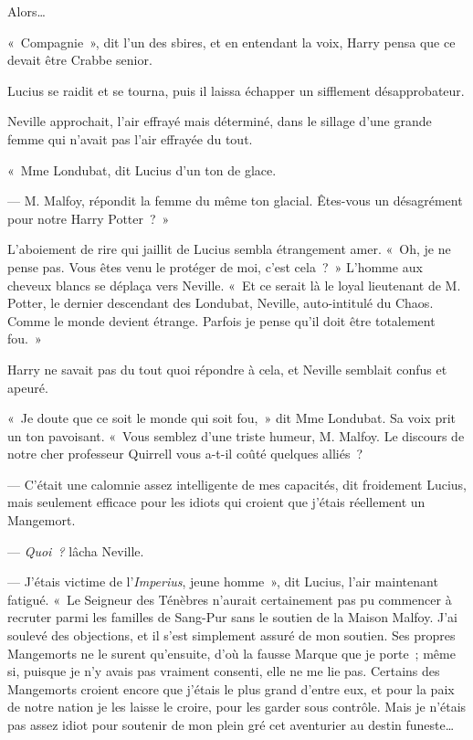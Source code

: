Alors…

«~Compagnie~», dit l'un des sbires, et en entendant la voix, Harry pensa que ce devait être Crabbe senior.

Lucius se raidit et se tourna, puis il laissa échapper un sifflement désapprobateur.

Neville approchait, l'air effrayé mais déterminé, dans le sillage d'une grande femme qui n'avait pas l'air effrayée du tout.

«~Mme Londubat, dit Lucius d'un ton de glace.

--- M. Malfoy, répondit la femme du même ton glacial.
Êtes-vous un désagrément pour notre Harry Potter~?~»

L'aboiement de rire qui jaillit de Lucius sembla étrangement amer.
«~Oh, je ne pense pas.
Vous êtes venu le protéger de moi, c'est cela~?~»
L'homme aux cheveux blancs se déplaça vers Neville.
«~Et ce serait là le loyal lieutenant de M. Potter, le dernier descendant des Londubat, Neville, auto-intitulé du Chaos.
Comme le monde devient étrange.
Parfois je pense qu'il doit être totalement fou.~»

Harry ne savait pas du tout quoi répondre à cela, et Neville semblait confus et apeuré.

«~Je doute que ce soit le monde qui soit fou,~» dit Mme Londubat.
Sa voix prit un ton pavoisant.
«~Vous semblez d'une triste humeur, M. Malfoy.
Le discours de notre cher professeur Quirrell vous a-t-il coûté quelques alliés~?

--- C'était une calomnie assez intelligente de mes capacités, dit froidement Lucius, mais seulement efficace pour les idiots qui croient que j'étais réellement un Mangemort.

--- \emph{Quoi~?} lâcha Neville.

--- J'étais victime de l'\emph{Imperius}, jeune homme~», dit Lucius, l'air maintenant fatigué.
«~Le Seigneur des Ténèbres n'aurait certainement pas pu commencer à recruter parmi les familles de Sang-Pur sans le soutien de la Maison Malfoy.
J'ai soulevé des objections, et il s'est simplement assuré de mon soutien.
Ses propres Mangemorts ne le surent qu'ensuite, d'où la fausse Marque que je porte~; même si, puisque je n'y avais pas vraiment consenti, elle ne me lie pas.
Certains des Mangemorts croient encore que j'étais le plus grand d'entre eux, et pour la paix de notre nation je les laisse le croire, pour les garder sous contrôle.
Mais je n'étais pas assez idiot pour soutenir de mon plein gré cet aventurier au destin funeste…

